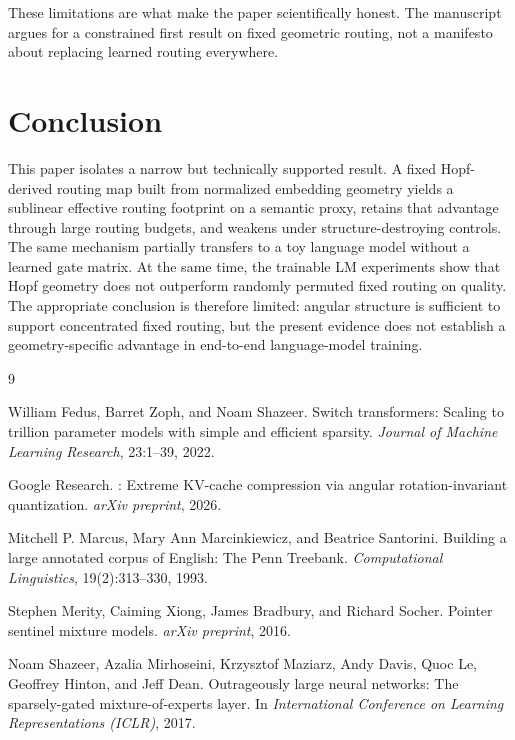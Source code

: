 \documentclass[10pt,twocolumn]{article}
\begin{document}
These limitations are what make the paper scientifically honest. The manuscript argues for a constrained first result on fixed geometric routing, not a manifesto about replacing learned routing everywhere.

\section{Conclusion}
This paper isolates a narrow but technically supported result. A fixed Hopf-derived routing map built from normalized embedding geometry yields a sublinear effective routing footprint on a semantic proxy, retains that advantage through large routing budgets, and weakens under structure-destroying controls. The same mechanism partially transfers to a toy language model without a learned gate matrix. At the same time, the trainable LM experiments show that Hopf geometry does not outperform randomly permuted fixed routing on quality. The appropriate conclusion is therefore limited: angular structure is sufficient to support concentrated fixed routing, but the present evidence does not establish a geometry-specific advantage in end-to-end language-model training.

\begin{thebibliography}{9}

William Fedus, Barret Zoph, and Noam Shazeer.
\newblock Switch transformers: Scaling to trillion parameter models with simple and efficient sparsity.
\newblock \emph{Journal of Machine Learning Research}, 23:1--39, 2022.

Google Research.
: Extreme {KV}-cache compression via angular rotation-invariant quantization.
\newblock \emph{arXiv preprint}, 2026.

Mitchell P. Marcus, Mary Ann Marcinkiewicz, and Beatrice Santorini.
\newblock Building a large annotated corpus of English: The {Penn Treebank}.
\newblock \emph{Computational Linguistics}, 19(2):313--330, 1993.

Stephen Merity, Caiming Xiong, James Bradbury, and Richard Socher.
\newblock Pointer sentinel mixture models.
\newblock \emph{arXiv preprint}, 2016.

Noam Shazeer, Azalia Mirhoseini, Krzysztof Maziarz, Andy Davis, Quoc Le, Geoffrey Hinton, and Jeff Dean.
\newblock Outrageously large neural networks: The sparsely-gated mixture-of-experts layer.
\newblock In \emph{International Conference on Learning Representations (ICLR)}, 2017.

\end{thebibliography}
\end{document}
